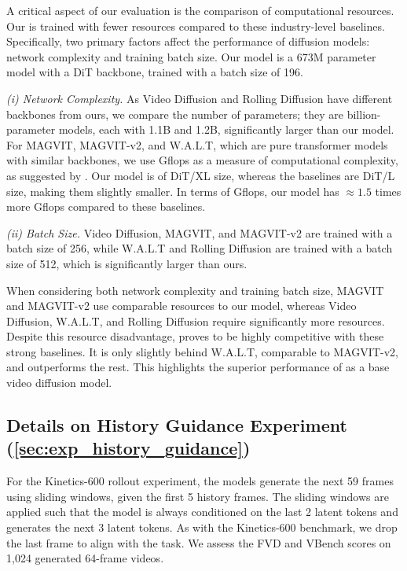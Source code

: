 A critical aspect of our evaluation is the comparison of computational resources. Our \mtd is trained with fewer resources compared to these industry-level baselines. Specifically, two primary factors affect the performance of diffusion models: network complexity and training batch size. Our \mtd model is a 673M parameter model with a DiT backbone, trained with a batch size of 196.

\emph{(i) Network Complexity.} As Video Diffusion and Rolling Diffusion have different backbones from ours, we compare the number of parameters; they are billion-parameter models, each with 1.1B and 1.2B, significantly larger than our model.  For MAGVIT, MAGVIT-v2, and W.A.L.T, which are pure transformer models with similar backbones, we use Gflops as a measure of computational complexity, as suggested by \cite{peebles2023scalable}. Our model is of DiT/XL size, whereas the baselines are DiT/L size, making them slightly smaller. In terms of Gflops, our model has $\approx 1.5$ times more Gflops compared to these baselines.

\emph{(ii) Batch Size.} Video Diffusion, MAGVIT, and MAGVIT-v2 are trained with a batch size of 256, while W.A.L.T and Rolling Diffusion are trained with a batch size of 512, which is significantly larger than ours.

When considering both network complexity and training batch size, MAGVIT and MAGVIT-v2 use comparable resources to our model, whereas Video Diffusion, W.A.L.T, and Rolling Diffusion require significantly more resources. Despite this resource disadvantage, \mtd proves to be highly competitive with these strong baselines. It is only slightly behind W.A.L.T, comparable to MAGVIT-v2, and outperforms the rest. This highlights the superior performance of \mtd as a base video diffusion model.


\subsection{Details on History Guidance Experiment (\cref{sec:exp_history_guidance})}
For the Kinetics-600 rollout experiment, the models generate the next 59 frames using sliding windows, given the first 5 history frames. The sliding windows are applied such that the model is always conditioned on the last 2 latent tokens and generates the next 3 latent tokens. As with the Kinetics-600 benchmark, we drop the last frame to align with the task. We assess the FVD and VBench scores on 1,024 generated 64-frame videos.

